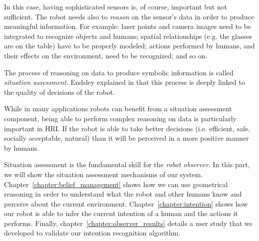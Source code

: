 In this case, having sophisticated sensors is, of course, important but not sufficient. The robot needs also to \textit{reason} on the sensor's data in order to produce meaningful information. For example: laser points and camera images need to be integrated to recognize objects and humans; spatial relationships  (e.g. the glasses are on the table) have to be properly modeled; actions performed by humans, and their effects on the environment, need to be recognized; and so on. 

The process of reasoning on data to produce symbolic information is called \textit{situation assessment}. Endsley explained in \cite{endsley1995toward} that this process is deeply linked to the quality of  decisions of the robot.

While in many applications robots can benefit from a situation assessment component, being able to perform complex reasoning on data is particularly important in HRI. If the robot is able to take better decisions (i.e.  efficient, safe, socially acceptable, natural) than it will be perceived in a more positive manner by humans. 

Situation assessment is the fundamental skill for the \textit{robot observer}. In this part, we will show the situation assessment mechanisms of our system. Chapter~\ref{chapter:belief_management} shows how we can use geometrical reasoning in order to understand what the robot and other humans know and perceive about the current environment. Chapter~\ref{chapter:intention} shows how our robot is able to infer the current intention of a human and the actions it performs. Finally, chapter~\ref{chapter:observer_results} details a user study that we developed to validate our intention recognition algorithm.



 
 
 

